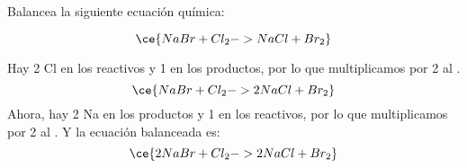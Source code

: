 Balancea la siguiente ecuación química:

\[
    \ce{NaBr + Cl_2 -> NaCl + Br_2}
\]

\begin{solutionbox}{4cm}
    Hay 2 Cl en los reactivos y 1 en los productos, por lo que multiplicamos por 2 al .
    \[
        \ce{NaBr + Cl_2 -> 2NaCl + Br_2}
    \]
    Ahora, hay 2 Na en los productos y 1 en los reactivos, por lo que multiplicamos por 2 al . Y la ecuación balanceada es:
    \[
        \ce{2NaBr + Cl_2 -> 2NaCl + Br_2}
    \]
\end{solutionbox}